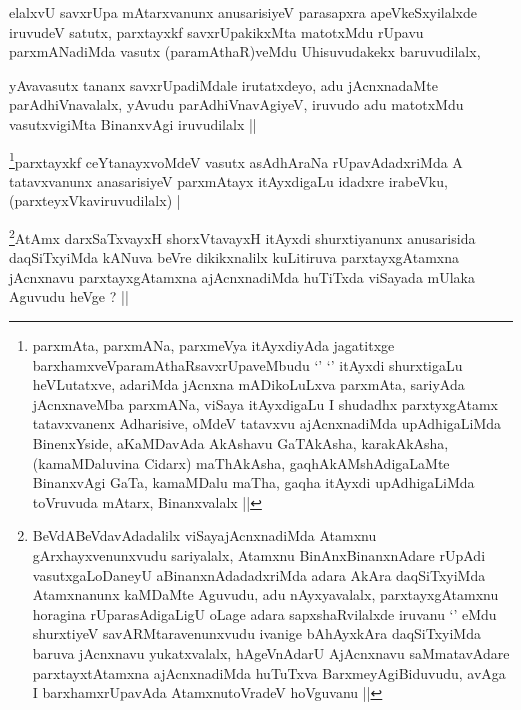 \begin{artha}
elalxvU savxrUpa mAtarxvanunx anusarisiyeV parasapxra apeVkeSxyilalxde
iruvudeV satutx, parxtayxkf savxrUpakikxMta matotxMdu rUpavu
parxmANadiMda vasutx (paramAthaR)veMdu Uhisuvudakekx baruvudilalx,
\end{artha}



\begin{artha}
yAvavasutx tananx savxrUpadiMdale irutatxdeyo, adu jAcnxnadaMte
parAdhiVnavalalx, yAvudu parAdhiVnavAgiyeV, iruvudo adu matotxMdu
vasutxvigiMta BinanxvAgi iruvudilalx ||
\end{artha}


\begin{artha}
\footnote[1]{parxmAta, parxmANa, parxmeVya itAyxdiyAda jagatitxge
  barxhamxveVparamAthaRsavxrUpaveMbudu `\stext' `\stext' itAyxdi
  shurxtigaLu heVLutatxve, adariMda jAcnxna mADikoLuLxva parxmAta,
  sariyAda jAcnxnaveMba parxmANa, viSaya itAyxdigaLu I shudadhx
  parxtyxgAtamx tatavxvanenx Adharisive, oMdeV tatavxvu ajAcnxnadiMda
  upAdhigaLiMda BinenxYside, aKaMDavAda AkAshavu GaTAkAsha,
  karakAkAsha, (kamaMDaluvina Cidarx) maThAkAsha, gaqhAkAMshAdigaLaMte
  BinanxvAgi GaTa, kamaMDalu maTha, gaqha itAyxdi upAdhigaLiMda
  toVruvuda mAtarx, Binanxvalalx ||}parxtayxkf ceYtanayxvoMdeV vasutx asAdhAraNa
rUpavAdadxriMda A tatavxvanunx anasarisiyeV parxmAtayx itAyxdigaLu
idadxre irabeVku, (parxteyxVkaviruvudilalx) |
\end{artha}




\begin{artha}
\footnote[2]{BeVdABeVdavAdadalilx viSayajAcnxnadiMda Atamxnu
  gArxhayxvenunxvudu sariyalalx, Atamxnu BinAnxBinanxnAdare rUpAdi
  vasutxgaLoDaneyU aBinanxnAdadadxriMda adara AkAra daqSiTxyiMda
  Atamxnanunx kaMDaMte Aguvudu, adu nAyxyavalalx, parxtayxgAtamxnu
  horagina rUparasAdigaLigU oLage adara sapxshaRvilalxde iruvanu
  `\stext' eMdu shurxtiyeV savARMtaravenunxvudu ivanige bAhAyxkAra
  daqSiTxyiMda baruva jAcnxnavu yukatxvalalx, hAgeVnAdarU AjAcnxnavu
  saMmatavAdare parxtayxtAtamxna ajAcnxnadiMda huTuTxva
  BarxmeyAgiBiduvudu, avAga I barxhamxrUpavAda AtamxnutoVradeV
  hoVguvanu ||}AtAmx darxSaTxvayxH shorxVtavayxH itAyxdi shurxtiyanunx
anusarisida daqSiTxyiMda kANuva beVre dikikxnalilx kuLitiruva
parxtayxgAtamxna jAcnxnavu parxtayxgAtamxna ajAcnxnadiMda huTiTxda
viSayada mUlaka Aguvudu heVge ? ||
\end{artha}

